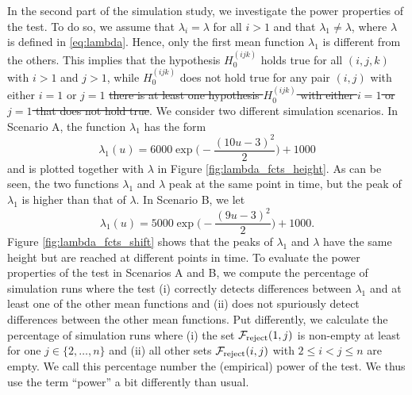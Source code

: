 \documentclass[a4paper,12pt]{article}
\numberwithin{equation}{section}
\begin{document}
In the second part of the simulation study, we investigate the power properties of the test. To do so, we assume that $\lambda_i = \lambda$ for all $i > 1$ and that $\lambda_1 \neq \lambda$, where $\lambda$ is defined in \eqref{eq:lambda}. Hence, only the first mean function $\lambda_1$ is different from the others. This implies that the hypothesis $H_0^{(ijk)}$ holds true for all $(i, j, k)$ with $i > 1$ and $j > 1$, {\color{red} while $H_0^{(ijk)}$ does not hold true for any pair $(i,j)$ with either $i=1$ or $j=1$ \sout{there is at least one hypothesis $H_0^{(ijk)}$ with either $i = 1$ or $j = 1$ that does not hold true}.} We consider two different simulation scenarios. In Scenario A, the function $\lambda_1$ has the form 
\[ \lambda_1(u) = 6000 \exp\Big(-\frac{(10 u-3)^2}{2}\Big) + 1000 \]
and is plotted together with $\lambda$ in Figure \ref{fig:lambda_fcts_height}. As can be seen, the two functions $\lambda_1$ and $\lambda$ peak at the same point in time, but the peak of $\lambda_1$ is higher than that of $\lambda$. In Scenario B, we let
\[ \lambda_1(u) = 5000 \exp\Big(-\frac{(9 u-3)^2}{2}\Big) + 1000. \]
Figure \ref{fig:lambda_fcts_shift} shows that the peaks of $\lambda_1$ and $\lambda$ have the same height but are reached at different points in time. To evaluate the power properties of the test in Scenarios A and B, we compute the percentage of simulation runs where the test (i) correctly detects differences between $\lambda_1$ and at least one of the other mean functions and (ii) does not spuriously detect differences between the other mean functions. Put differently, we calculate the percentage of simulation runs where (i) the set $\mathcal{F}_{\text{reject}}(1, j)$ is non-empty at least for one $j \in \{2, \ldots, n\}$ and (ii) all other sets $\mathcal{F}_{\text{reject}}(i, j)$ with $2 \leq i < j \leq n$ are empty. We call this percentage number the (empirical) power of the test. We thus use the term ``power'' a bit differently than usual.  
\end{document}
